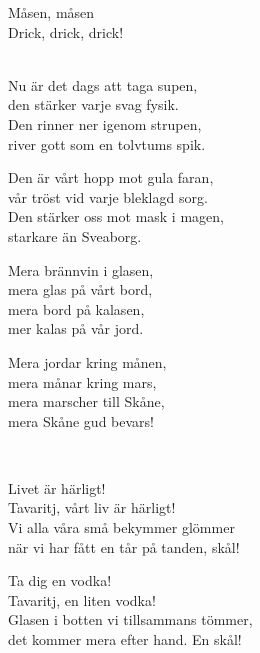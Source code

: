 \newpage


\melochtext{} 

\songtext{}Måsen, måsen\\
Drick, drick, drick! \\


 \\       

\songtext{}Nu är det dags att taga supen,\\
den stärker varje svag fysik.\\
Den rinner ner igenom strupen,\\
river gott som en tolvtums spik.

Den är vårt hopp mot gula faran,\\
vår tröst vid varje bleklagd sorg.\\
Den stärker oss mot mask i magen,\\
starkare än Sveaborg.

Mera brännvin i glasen,\\
mera glas på vårt bord,\\
mera bord på kalasen,\\
mer kalas på vår jord.

Mera jordar kring månen,\\
mera månar kring mars,\\
mera marscher till Skåne,\\
mera Skåne gud bevars!\\

\newpage 


 \\       

\songtext{}
Livet är härligt!\\
Tavaritj, vårt liv är härligt!\\
Vi alla våra små bekymmer glömmer\\
när vi har fått en tår på tanden, skål!

Ta dig en vodka!\\
Tavaritj, en liten vodka!\\
Glasen i botten vi tillsammans tömmer,\\
det kommer mera efter hand. En skål!

